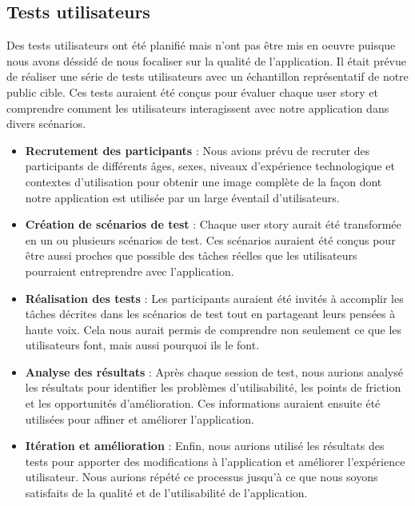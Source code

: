 \subsection{Tests utilisateurs}

Des tests utilisateurs ont été planifié mais n'ont pas être mis en oeuvre puisque nous avons déssidé de nous focaliser sur la qualité de l'application. Il était prévue de réaliser une série de tests utilisateurs avec un échantillon représentatif de notre public cible. Ces tests auraient été conçus pour évaluer chaque user story et comprendre comment les utilisateurs interagissent avec notre application dans divers scénarios.

\begin{itemize}
    \item \textbf{Recrutement des participants} : Nous avions prévu de recruter des participants de différents âges, sexes, niveaux d'expérience technologique et contextes d'utilisation pour obtenir une image complète de la façon dont notre application est utilisée par un large éventail d'utilisateurs.
    \item \textbf{Création de scénarios de test} : Chaque user story aurait été transformée en un ou plusieurs scénarios de test. Ces scénarios auraient été conçus pour être aussi proches que possible des tâches réelles que les utilisateurs pourraient entreprendre avec l'application.
    \item \textbf{Réalisation des tests} : Les participants auraient été invités à accomplir les tâches décrites dans les scénarios de test tout en partageant leurs pensées à haute voix. Cela nous aurait permis de comprendre non seulement ce que les utilisateurs font, mais aussi pourquoi ils le font.
    \item \textbf{Analyse des résultats} :  Après chaque session de test, nous aurions analysé les résultats pour identifier les problèmes d'utilisabilité, les points de friction et les opportunités d'amélioration. Ces informations auraient ensuite été utilisées pour affiner et améliorer l'application.
    \item \textbf{Itération et amélioration} : Enfin, nous aurions utilisé les résultats des tests pour apporter des modifications à l'application et améliorer l'expérience utilisateur. Nous aurions répété ce processus jusqu'à ce que nous soyons satisfaits de la qualité et de l'utilisabilité de l'application.
\end{itemize}


